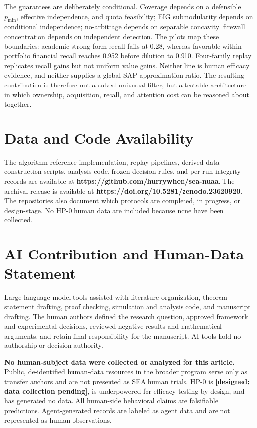\documentclass[
  11pt]{article}
\begin{document}
The guarantees are deliberately conditional. Coverage depends on a defensible \(p_{\min}\), effective independence, and quota feasibility; EIG submodularity depends on conditional independence; no-arbitrage depends on separable concavity; firewall concentration depends on independent detection. The pilots map these boundaries: academic strong-form recall fails at 0.28, whereas favorable within-portfolio financial recall reaches 0.952 before dilution to 0.910. Four-family replay replicates recall gains but not uniform value gains. Neither line is human efficacy evidence, and neither supplies a global SAP approximation ratio. The resulting contribution is therefore not a solved universal filter, but a testable architecture in which ownership, acquisition, recall, and attention cost can be reasoned about together.

\section{Data and Code Availability}\label{data-and-code-availability}

The algorithm reference implementation, replay pipelines, derived-data construction scripts, analysis code, frozen decision rules, and per-run integrity records are available at \textbf{https://github.com/hurrywhen/sea-nuaa}. The archival release is available at \textbf{https://doi.org/10.5281/zenodo.23620920}. The repositories also document which protocols are completed, in progress, or design-stage. No HP-0 human data are included because none have been collected.

\section{AI Contribution and Human-Data Statement}\label{ai-contribution-and-human-data-statement}

Large-language-model tools assisted with literature organization, theorem-statement drafting, proof checking, simulation and analysis code, and manuscript drafting. The human authors defined the research question, approved framework and experimental decisions, reviewed negative results and mathematical arguments, and retain final responsibility for the manuscript. AI tools hold no authorship or decision authority.

\textbf{No human-subject data were collected or analyzed for this article.} Public, de-identified human-data resources in the broader program serve only as transfer anchors and are not presented as SEA human trials. HP-0 is \textbf{{[}designed; data collection pending{]}}, is underpowered for efficacy testing by design, and has generated no data. All human-side behavioral claims are falsifiable predictions. Agent-generated records are labeled as agent data and are not represented as human observations.
\end{document}
